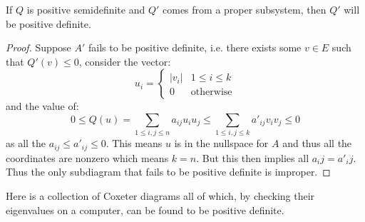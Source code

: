 \documentclass[../main.tex]{subfiles}
\begin{document}
\begin{proposition}
    If $Q$ is positive semidefinite and $Q'$ comes from a proper subsystem, then $Q'$ will be positive definite.
    \begin{proof}
        Suppose $A'$ fails to be positive definite, i.e. there exists some $v\in E$ such that $Q'(v)\leq 0$, consider the vector:\[
            u_i = \begin{cases}
                |v_i| & 1\leq i \leq k\\
                0 & \text{otherwise}
            \end{cases}
        \] and the value of: \[
        0\leq Q(u) = \sum_{1\leq i,j\leq n} a_{ij}u_i u_j \leq \sum_{1\leq i,j\leq k} a'_{ij}v_i v_j \leq 0
        \] as all the $a_{ij}\leq a'_{ij}\leq 0$. This means $u$ is in the nullspace for $A$ and thus all the coordinates are nonzero which means $k=n$. But this then implies all $a_ij = a'_ij$. Thus the only subdiagram that fails to be positive definite is improper.
    \end{proof}
\end{proposition}

Here is a collection of Coxeter diagrams all of which, by checking their eigenvalues on a computer, can be found to be positive definite.
\end{document}
